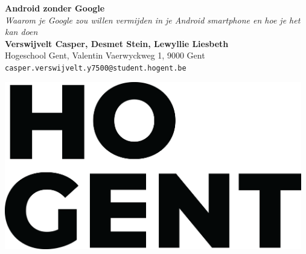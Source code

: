 \documentclass[a0,portrait]{a0poster}
\begin{document}
    



\begin{minipage}[t]{0.75\linewidth}
\VeryHuge \color{HoGentAccent1} \textbf{Android zonder Google} \color{Black}\\ %
\Huge\textit{Waarom je Google zou willen vermijden in je Android smartphone en hoe je het kan doen}\\[2.4cm] %
\huge \textbf{Verswijvelt Casper, Desmet Stein, Lewyllie Liesbeth}\\[0.5cm] %
\huge Hogeschool Gent, Valentin Vaerwyckweg 1, 9000 Gent\\[0.4cm] %
\Large \texttt{casper.verswijvelt.y7500@student.hogent.be} \\
\end{minipage}
%
\begin{minipage}[t]{0.25\linewidth}
\includegraphics[width=13cm,right]{figures/HOGENT_Logo_Pos_rgb.png} 

\end{minipage}

\vspace{1cm} %
\end{document}

